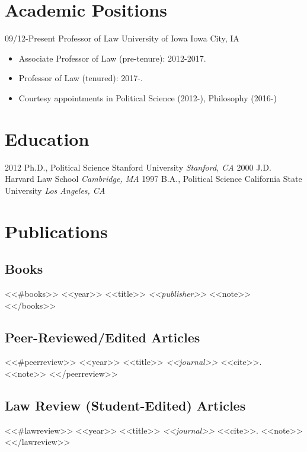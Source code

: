 \documentclass[letterpaper]{moderncv}
\begin{document}
\makecvtitle

\lfoot{\thepage}

%
%
\section{Academic Positions}
\cventry
{09/12-Present}
{Professor of Law}
{University of Iowa}
{Iowa City, IA}
{}
{\begin{itemize}%
	\item Associate Professor of Law (pre-tenure): 2012-2017.
	\item Professor of Law (tenured): 2017-.
	\item Courtesy appointments in Political Science (2012-), Philosophy (2016-)
	\end{itemize}}
%
%
\section{Education}
\cventry
{2012}
{Ph.D., Political Science}
{Stanford University}
{}
{\textit{Stanford, CA}}
{}
\cventry
{2000}
{J.D.}
{Harvard Law School}
{}
{\textit{Cambridge, MA}}
{}
\cventry
{1997}
{B.A., Political Science}
{California State University}
{}
{\textit{Los Angeles, CA}}
{}
%
%
\section{Publications}
\subsection{Books}
<<#books>>
\cventry
{<<year>>}
{<<title>>}
{}
{\textit{<<publisher>>}}
{}
{<<note>>}
\vspace{1mm}
<</books>>
\vspace{1mm}
\subsection{Peer-Reviewed/Edited Articles}
<<#peerreview>>
\cventry
{<<year>>}
{<<title>>}
{}
{\textit{<<journal>>}}
{}
{<<cite>>. <<note>>}
\vspace{1mm}
<</peerreview>>
\vspace{1mm}
\subsection{Law Review (Student-Edited) Articles}
<<#lawreview>>
\cventry
{<<year>>}
{<<title>>}
{}
{\textit{<<journal>>}}
{}
{<<cite>>. <<note>>}
\vspace{1mm}
<</lawreview>>
\vspace{1mm}
\end{document}
